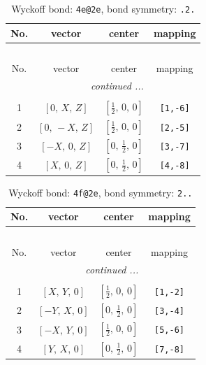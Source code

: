 \documentclass[fleqn,8pt]{jsarticle}
\begin{document}
\renewcommand{\arraystretch}{1.2}
\begin{longtable}{cccc}
\caption{Wyckoff bond: {\tt 4e@2e}, bond symmetry: {\tt .2.}}
 \\
 \hline \hline
No. & vector & center & mapping \\ \hline \endfirsthead

\multicolumn{3}{l}{\tablename\ \thetable{}} \\
 \hline \hline
No. & vector & center & mapping \\ \hline \endhead

 \hline \hline
\multicolumn{3}{r}{\footnotesize\it continued ...} \\ \endfoot

 \hline \hline
\multicolumn{3}{r}{} \\ \endlastfoot

1 & $\left[ 0,\, X,\, Z \right]$ & $\left[ \frac{1}{2},\, 0,\, 0 \right]$ & {\tt [1,-6]} \\ \hline
2 & $\left[ 0,\, - X,\, Z \right]$ & $\left[ \frac{1}{2},\, 0,\, 0 \right]$ & {\tt [2,-5]} \\ \hline
3 & $\left[ - X,\, 0,\, Z \right]$ & $\left[ 0,\, \frac{1}{2},\, 0 \right]$ & {\tt [3,-7]} \\ \hline
4 & $\left[ X,\, 0,\, Z \right]$ & $\left[ 0,\, \frac{1}{2},\, 0 \right]$ & {\tt [4,-8]} \\
\end{longtable}
\renewcommand{\arraystretch}{1.2}
\begin{longtable}{cccc}
\caption{Wyckoff bond: {\tt 4f@2e}, bond symmetry: {\tt 2..}}
 \\
 \hline \hline
No. & vector & center & mapping \\ \hline \endfirsthead

\multicolumn{3}{l}{\tablename\ \thetable{}} \\
 \hline \hline
No. & vector & center & mapping \\ \hline \endhead

 \hline \hline
\multicolumn{3}{r}{\footnotesize\it continued ...} \\ \endfoot

 \hline \hline
\multicolumn{3}{r}{} \\ \endlastfoot

1 & $\left[ X,\, Y,\, 0 \right]$ & $\left[ \frac{1}{2},\, 0,\, 0 \right]$ & {\tt [1,-2]} \\ \hline
2 & $\left[ - Y,\, X,\, 0 \right]$ & $\left[ 0,\, \frac{1}{2},\, 0 \right]$ & {\tt [3,-4]} \\ \hline
3 & $\left[ - X,\, Y,\, 0 \right]$ & $\left[ \frac{1}{2},\, 0,\, 0 \right]$ & {\tt [5,-6]} \\ \hline
4 & $\left[ Y,\, X,\, 0 \right]$ & $\left[ 0,\, \frac{1}{2},\, 0 \right]$ & {\tt [7,-8]} \\
\end{longtable}
\end{document}
